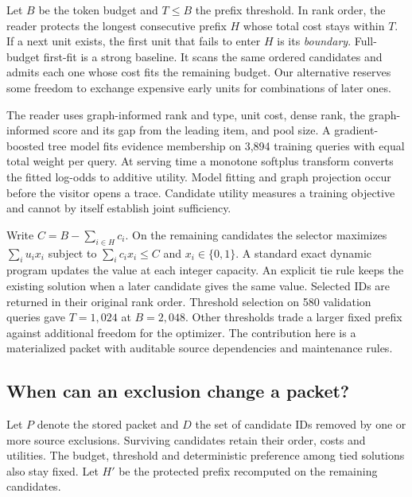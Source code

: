 \documentclass[conference]{IEEEtran}
\begin{document}
Let $B$ be the token budget and $T\leq B$ the prefix threshold. In rank order, the reader protects the longest consecutive prefix $H$ whose total cost stays within $T$. If a next unit exists, the first unit that fails to enter $H$ is its \emph{boundary}. Full-budget first-fit is a strong baseline. It scans the same ordered candidates and admits each one whose cost fits the remaining budget. Our alternative reserves some freedom to exchange expensive early units for combinations of later ones.

The reader uses graph-informed rank and type, unit cost, dense rank, the graph-informed score and its gap from the leading item, and pool size. A gradient-boosted tree model fits evidence membership on 3,894 training queries with equal total weight per query. At serving time a monotone softplus transform converts the fitted log-odds to additive utility. Model fitting and graph projection occur before the visitor opens a trace. Candidate utility measures a training objective and cannot by itself establish joint sufficiency.

Write $C=B-\sum_{i\in H} c_i$. On the remaining candidates the selector maximizes $\sum_i u_i x_i$ subject to $\sum_i c_i x_i\leq C$ and $x_i\in\{0,1\}$. A standard exact dynamic program updates the value at each integer capacity. An explicit tie rule keeps the existing solution when a later candidate gives the same value. Selected IDs are returned in their original rank order. Threshold selection on 580 validation queries gave $T=1,024$ at $B=2,048$. Other thresholds trade a larger fixed prefix against additional freedom for the optimizer. The contribution here is a materialized packet with auditable source dependencies and maintenance rules.

\subsection{When can an exclusion change a packet?}
Let $P$ denote the stored packet and $D$ the set of candidate IDs removed by one or more source exclusions. Surviving candidates retain their order, costs and utilities. The budget, threshold and deterministic preference among tied solutions also stay fixed. Let $H'$ be the protected prefix recomputed on the remaining candidates.
\end{document}
